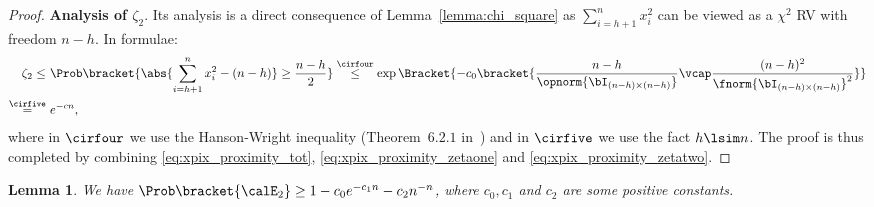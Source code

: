 \documentclass[11pt]{article}
\newtheorem{lemma}{Lemma}
\begin{document}
\begin{proof}
\vspace{0.1in}
\noindent
\textbf{Analysis of $\zeta_2$}.
Its analysis is a direct consequence of Lemma~\ref{lemma:chi_square}
as $\sum_{i=h+1}^n x_i^2$ can be viewed as a
$\chi^2$ RV with freedom $n-h$. In formulae:
\begin{align}
\label{eq:xpix_proximity_zetatwo}
\zeta_2\leq~&
\Prob\bracket{\abs{\sum_{i=h+1}^n x_i^2 - (n-h)} \geq \frac{n-h}{2}}
\stackrel{\cirfour}{\leq}
\exp\Bracket{-c_0\bracket{\frac{n-h}{\opnorm{\bI_{(n-h)\times (n-h)}}}\vcap \frac{(n-h)^2}{\fnorm{\bI_{(n-h)\times (n-h)}}^2}}} \notag \\
\stackrel{\cirfive}{=}~& e^{-cn},
\end{align}
where in $\cirfour$ we use the Hanson-Wright inequality (Theorem~$6.2.1$ in~\citet{vershynin2018high}) and
in $\cirfive$ we use the fact $h \lsim n$.
The proof is thus completed by combining
\eqref{eq:xpix_proximity_tot}, \eqref{eq:xpix_proximity_zetaone}
and \eqref{eq:xpix_proximity_zetatwo}.
\end{proof}

\begin{lemma}
\label{lemma:event2}
We have $\Prob\bracket{\calE_2} \geq 1 - c_0 e^{-c_1 n} - c_2
n^{-n}$, where $c_0, c_1$ and $c_2$ are some positive constants.
\end{lemma}
\end{document}
